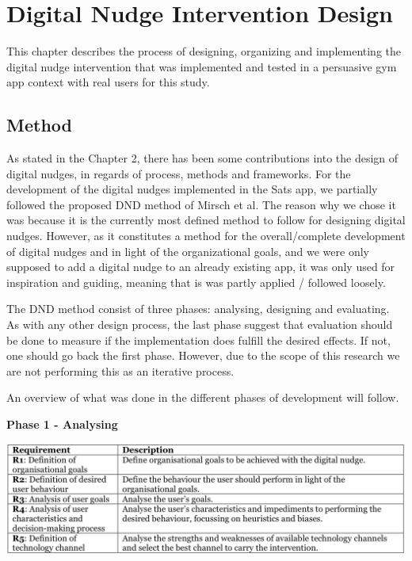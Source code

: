 \chapter{Digital Nudge Intervention Design}
This chapter describes the process of designing, organizing and implementing the digital nudge intervention that was implemented and tested in a persuasive gym app context with real users for this study. 

\section{Method} 
As stated in the Chapter 2, there has been some contributions into the design of digital nudges, in regards of process, methods and frameworks. For the development of the digital nudges implemented in the Sats app, we partially followed the proposed DND method of Mirsch et al. The reason why we chose it was because it is the currently most defined method to follow for designing digital nudges. However, as it constitutes a method for the overall/complete development of digital nudges and in light of the organizational goals, and we were only supposed to add a digital nudge to an already existing app, it was only used for inspiration and guiding, meaning that is was partly applied / followed loosely.

The DND method consist of three phases: analysing, designing and evaluating. As with any other design process, the last phase suggest that evaluation should be done to measure if the implementation does fulfill the desired effects. If not, one should go back the first phase. However, due to the scope of this research we are not performing this as an iterative process. 

An overview of what was done in the different phases of development will follow. 

\bigbreak

\textbf{Phase 1 - Analysing}

\bigbreak
\includegraphics[width=1\textwidth]{images/Phase1.png}
\bigbreak

